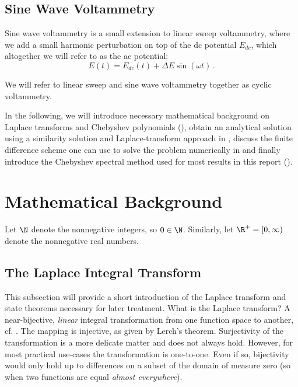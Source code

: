 \documentclass{prettytex/ox/mmsc-special-topic}
\begin{document}
  \subsection{Sine Wave Voltammetry}
  Sine wave voltammetry is a small extension to linear sweep voltammetry, where we add a small harmonic perturbation on top of the \gls{dc} potential $E_{dc}$, which altogether we will refer to as the \gls{ac} potential:
  \begin{equation}
    E(t) = E_{dc}(t) + \Delta E \sin(\omega t)\,.
    \label{eq:ac-potential}
  \end{equation}

  We will refer to linear sweep and sine wave voltammetry together as cyclic voltammetry.

  In the following, we will introduce necessary mathematical background on Laplace transforms and Chebyshev polynomials (), obtain an analytical solution using a similarity solution and Laplace-transform approach in , discuss the finite difference scheme one can use to solve the problem numerically in  and finally introduce the Chebyshev spectral method used for most results in this report ().

  \pagebreak
  \section{Mathematical Background}
  \label{sec:math-background}
  Let $\N$ denote the nonnegative integers, so $0 \in \N$.
  Similarly, let $\R^+ = [0, \infty)$ denote the nonnegative real numbers.

  \subsection{The Laplace Integral Transform}
  This subsection will provide a short introduction of the Laplace transform and state theorems necessary for later treatment. What is the Laplace transform?
  A near-bijective, \emph{linear} integral transformation from one function space to another, cf. .
  The mapping is injective, as given by Lerch's theorem. Surjectivity of the transformation is a more delicate matter and does not always hold.
  However, for most practical use-cases the transformation is one-to-one.
  Even if so, bijectivity would only hold up to differences on a subset of the domain of measure zero (so when two functions are equal \textit{almost everywhere}).
\end{document}

